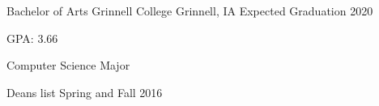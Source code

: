 \documentclass[12pt, a4paper]{awesome-cv}
\begin{document}
\makecvheader


\begin{cventries}
  \cventry
    {Bachelor of Arts}
    {Grinnell College}
    {Grinnell, IA}
    {Expected Graduation 2020}
    {
      \begin{cvitems}
        \item{GPA: 3.66}
	\item{Computer Science Major}
        \item {Deans list Spring and Fall 2016}
      \end{cvitems}
    }
\end{cventries}

\end{document}
